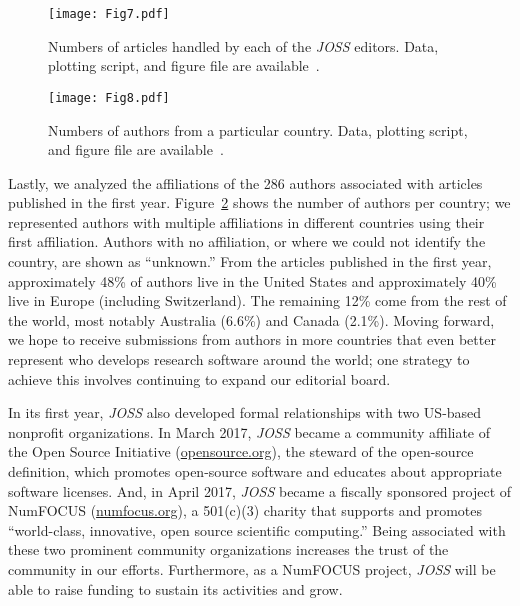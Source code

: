 \documentclass{article}
\newcommand\joss{\textit{JOSS}}
\begin{document}
\begin{figure}[htbp]
    \centering
    \texttt{[image: Fig7.pdf]}
    \caption{Numbers of articles handled by each of the \joss{}
    editors. Data, plotting script, and figure file are available~\cite{JOSS-data-figs}.
    }
    \label{fig:editors}
\end{figure}

\begin{figure}[htbp]
    \centering
    \texttt{[image: Fig8.pdf]}
    \caption{Numbers of authors from a particular country.
    Data, plotting script, and figure file are available~\cite{JOSS-data-figs}.
    }
    \label{fig:affiliations}
\end{figure}

Lastly, we analyzed the affiliations of the 286 authors associated with articles published in the first year.
Figure~\ref{fig:affiliations} shows the number of authors per country; we represented authors with multiple affiliations in different countries using their first affiliation. Authors with no affiliation, or where we could not identify the country, are shown as ``unknown.''
From the articles published in the first year, approximately 48\% of authors live in the United States and approximately 40\% live in Europe (including Switzerland). The remaining 12\% come from the rest of the world, most notably Australia (6.6\%) and Canada (2.1\%).
Moving forward, we hope to receive submissions from authors in more countries that even better represent who develops research software around the world; one strategy to achieve this involves continuing to expand our editorial board.


In its first year, \joss{} also developed formal relationships with two US-based nonprofit organizations. In March 2017, \joss{} became a community affiliate of the Open Source Initiative (\href{https://opensource.org}{opensource.org}), the steward of the open-source definition, which promotes open-source software and educates about appropriate software licenses.
And, in April 2017, \joss{} became a fiscally sponsored project of NumFOCUS (\href{https://www.numfocus.org}{numfocus.org}), a 501(c)(3) charity that supports and promotes ``world-class, innovative, open source scientific computing.''
Being associated with these two prominent community organizations increases the trust of the community in our efforts.
Furthermore, as a NumFOCUS project, \joss{} will be able to raise funding to sustain its activities and grow.
\end{document}
